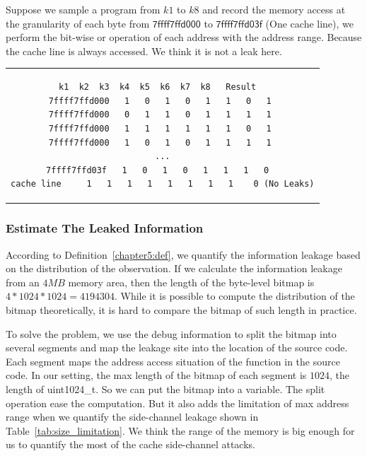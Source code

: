 \begin{myexample}
Suppose we sample a program from $k1$ to $k8$ and record the memory access at the granularity of each byte from $\mathsf{7ffff7ffd000}$ to $\mathsf{7ffff7ffd03f}$ (One cache line), we perform the bit-wise or operation of each address with the address range. Because the cache line is always accessed. We think it is not a leak here.
\begin{center}
  \begin{tabular}{c}
    {
      \begin{lstlisting}[frame=none]
              k1  k2  k3  k4  k5  k6  k7  k8   Result  
7ffff7ffd000   1   0   1   0   1   1   0   1 
7ffff7ffd000   0   1   1   0   1   1   1   1 
7ffff7ffd000   1   1   1   1   1   1   0   1 
7ffff7ffd000   1   0   1   0   1   1   1   1 
...
7ffff7ffd03f   1   0   1   0   1   1   1   0  
cache line     1   1   1   1   1   1   1   1    0 (No Leaks)
\end{lstlisting}
    }
  \end{tabular}
\end{center}
\end{myexample}

\subsubsection{Estimate The Leaked Information}
According to Definition~\ref{chapter5:def}, we quantify the information leakage based on the distribution of the observation. If we calculate the information leakage from an $4MB$ memory area, then the length of the byte-level bitmap is $4*1024*1024 = 4194304$. While it is possible to compute the distribution of the bitmap theoretically, it is hard to compare the bitmap of such length in practice.

To solve the problem, we use the debug information to split the bitmap into several segments and map the leakage site into the location of the source code. Each segment maps the address access situation of the function in the source code. In our setting, the max length of the bitmap of each segment is $1024$, the length of \textsf{uint1024\_t}. So we can put the bitmap into a variable. The split operation ease the computation. But it also adds the limitation of max address range when we quantify the side-channel leakage shown in Table~\ref{tab:size_limitation}. We think the range of the memory is big enough for us to quantify the most of the cache side-channel attacks.

\begin{table}[h]
  \centering
  \caption{The maximum range address range when we quantify the amount of the leakage with different granularity.}
  \label{tab:size_limitation}
\end{table}

